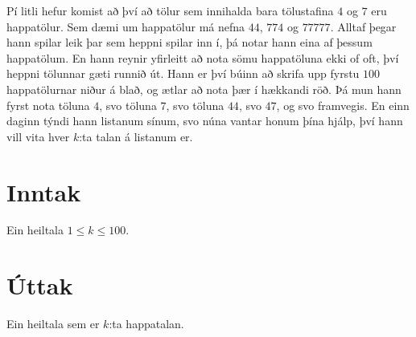 
Pí litli hefur komist að því að tölur sem innihalda bara tölustafina $4$ og $7$
eru happatölur. Sem dæmi um happatölur má nefna $44$, $774$ og $77777$. Alltaf
þegar hann spilar leik þar sem heppni spilar inn í, þá notar hann eina af
þessum happatölum. En hann reynir yfirleitt að nota sömu happatöluna ekki of
oft, því heppni tölunnar gæti runnið út. Hann er því búinn að skrifa upp fyrstu
$100$ happatölurnar niður á blað, og ætlar að nota þær í hækkandi röð. Þá
mun hann fyrst nota töluna $4$, svo töluna $7$, svo töluna $44$, svo $47$, og
svo framvegis. En einn daginn týndi hann listanum sínum, svo núna vantar honum
þína hjálp, því hann vill vita hver $k$:ta talan á listanum er.

\section*{Inntak}
Ein heiltala $1 \leq k \leq 100$.

\section*{Úttak}
Ein heiltala sem er $k$:ta happatalan.

